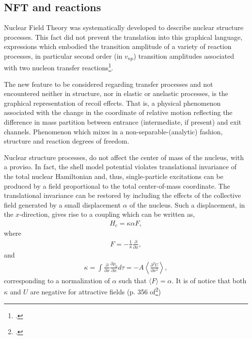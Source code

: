 \begin{subappendices}
\section{NFT and reactions}\label{App1.D}
Nuclear Field Theory was systematically developed to describe nuclear structure processes. This fact did not prevent the translation into this graphical language,  expressions which embodied the transition amplitude of a variety of reaction processes, in particular second order (in $v_{np}$) transition amplitudes associated with two nucleon transfer reactions\footnote{\cite{Broglia:75,Broglia:04a}.}.


The new feature to be considered regarding transfer processes and not encountered neither in structure, nor in elastic or anelastic processes, is the graphical representation of recoil effects. That is, a physical phenomenon associated with the change in the coordinate of relative motion reflecting the difference in mass partition between entrance (intermediate, if present) and exit channels. Phenomenon which mixes in a non-separable-(analytic) fashion, structure and reaction degrees of freedom.

Nuclear structure processes, do not affect the center of mass of the nucleus, with a proviso. In fact, the shell model potential violates translational invariance of the total nuclear Hamiltonian and, thus, single-particle excitations can be produced by a field proportional to the total center-of-mass coordinate. The translational invariance can be restored by including  the effects of the collective field generated by a small displacement $\alpha$ of the nucleus. Such a displacement, in the $x$-direction, gives rise to a coupling which can be written as,
\begin{align}\label{eq1.D.1}
H_{c}=\kappa\alpha F,
\end{align}
where 
\begin{align}\label{eq1.D.2}
F=-\frac{1}{\kappa}\frac{\partial}{\partial x},
\end{align}
and
\begin{align}\label{eq1.D.3}
\kappa=\int\frac{\partial}{\partial x}\frac{\partial \rho_0}{\partial x}d\tau=-A\left\langle\frac{\partial^2U}{\partial x^2}\right\rangle,
\end{align}
corresponding to a normalization of $\alpha$ such that $\langle F\rangle=\alpha$. It is of notice that both $\kappa$ and $U$ are negative for attractive fields (p. 356 of\footnote{\cite{Bohr:75}.})



\end{subappendices}
